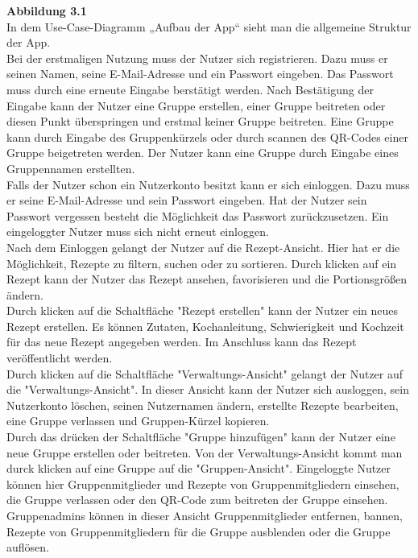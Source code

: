 \documentclass[parskip=full]{scrartcl}
\begin{document}
\textbf{Abbildung 3.1}\\
In dem Use-Case-Diagramm „Aufbau der App“ sieht man die allgemeine Struktur der App.\\
Bei der erstmaligen Nutzung muss der Nutzer sich registrieren.
Dazu muss er seinen Namen, seine E-Mail-Adresse und ein Passwort eingeben.
Das Passwort muss durch eine erneute Eingabe berstätigt werden.
Nach Bestätigung der Eingabe kann der Nutzer eine Gruppe erstellen, einer Gruppe beitreten oder diesen Punkt überspringen und erstmal keiner Gruppe beitreten.
Eine Gruppe kann durch Eingabe des Gruppenkürzels oder durch scannen des QR-Codes einer Gruppe beigetreten werden.
Der Nutzer kann eine Gruppe durch Eingabe eines Gruppennamen erstellten.\\
Falls der Nutzer schon ein Nutzerkonto besitzt kann er sich einloggen.
Dazu muss er seine E-Mail-Adresse und sein Passwort eingeben.
Hat der Nutzer sein Passwort vergessen besteht die Möglichkeit das Passwort zurückzusetzen.
Ein eingeloggter Nutzer muss sich nicht erneut einloggen.\\
Nach dem Einloggen gelangt der Nutzer auf die Rezept-Ansicht.
Hier hat er die Möglichkeit, Rezepte zu filtern, suchen oder zu sortieren.
Durch klicken auf ein Rezept kann der Nutzer das Rezept ansehen, favorisieren und die Portionsgrößen ändern.\\
Durch klicken auf die Schaltfläche "Rezept erstellen" kann der Nutzer ein neues Rezept erstellen.
Es können Zutaten, Kochanleitung, Schwierigkeit und Kochzeit ƒür das neue Rezept angegeben werden.
Im Anschluss kann das Rezept veröffentlicht werden.\\
Durch klicken auf die Schaltfläche "Verwaltungs-Ansicht" gelangt der Nutzer auf die "Verwaltungs-Ansicht".
In dieser Ansicht kann der Nutzer sich ausloggen, sein Nutzerkonto löschen, seinen Nutzernamen ändern, 
erstellte Rezepte bearbeiten, eine Gruppe verlassen und Gruppen-Kürzel kopieren.\\
Durch das drücken der Schaltfläche "Gruppe hinzufügen" kann der Nutzer eine neue Gruppe erstellen oder beitreten.
Von der Verwaltungs-Ansicht kommt man durck klicken auf eine Gruppe auf die "Gruppen-Ansicht".
Eingeloggte Nutzer können hier Gruppenmitglieder und Rezepte von Gruppenmitgliedern einsehen, die Gruppe verlassen oder den QR-Code zum beitreten der Gruppe einsehen.
Gruppenadmins können in dieser Ansicht Gruppenmitglieder entfernen, bannen, Rezepte von Gruppenmitgliedern für die Gruppe ausblenden oder die Gruppe auflösen.
\end{document}
